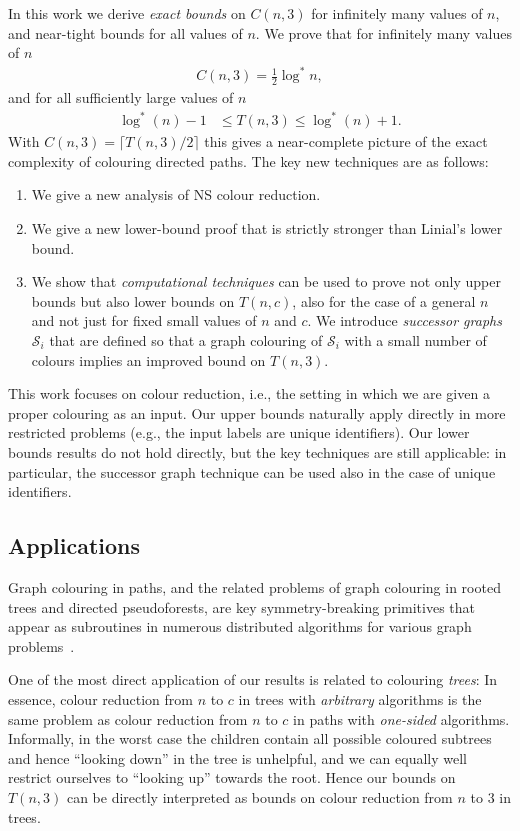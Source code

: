 \documentclass[a4paper,11pt]{article}
\theoremstyle{remark}
\newcommand{\cS}{\mathcal{S}}
\newcommand{\logst}{\log^{*}}
\begin{document}
In this work we derive \emph{exact bounds} on $C(n,3)$ for infinitely many values of $n$, and near-tight bounds for all values of $n$. We prove that for infinitely many values of $n$
\begin{align*}
    C(n,3) = \frac{1}{2} \logst n,
\end{align*}
and for all sufficiently large values of $n$
\begin{align*}
    \logst(n) - 1 &\le T(n,3) \le \logst(n) + 1.
\end{align*}
With $C(n,3) = \lceil T(n,3)/2 \rceil$ this gives a near-complete picture of the exact complexity of colouring directed paths. The key new techniques are as follows:
\begin{enumerate}
    \item We give a new analysis of NS colour reduction.
    \item We give a new lower-bound proof that is strictly stronger than Linial's lower bound.
    \item We show that \emph{computational techniques} can be used to prove not only upper bounds but also lower bounds on $T(n,c)$, also for the case of a general $n$ and not just for fixed small values of $n$ and $c$. We introduce \emph{successor graphs} $\cS_i$ that are defined so that a graph colouring of $\cS_i$ with a small number of colours implies an improved bound on $T(n,3)$.
\end{enumerate}
This work focuses on colour reduction, i.e., the setting in which we are given a proper colouring as an input. Our upper bounds naturally apply directly in more restricted problems (e.g., the input labels are unique identifiers). Our lower bounds results do not hold directly, but the key techniques are still applicable: in particular, the successor graph technique can be used also in the case of unique identifiers.


\subsection{Applications}

Graph colouring in paths, and the related problems of graph colouring in rooted trees and directed pseudoforests, are key symmetry-breaking primitives that appear as subroutines in numerous distributed algorithms for various graph problems~\cite{goldberg88parallel,panconesi01some,garay98sublinear,astrand10vc-sc,czygrinow08fast,lenzen14steiner}.

One of the most direct application of our results is related to colouring \emph{trees}: In essence, colour reduction from $n$ to $c$ in trees with \emph{arbitrary} algorithms is the same problem as colour reduction from $n$ to $c$ in paths with \emph{one-sided} algorithms. Informally, in the worst case the children contain all possible coloured subtrees and hence ``looking down'' in the tree is unhelpful, and we can equally well restrict ourselves to ``looking up'' towards the root. Hence our bounds on $T(n,3)$ can be directly interpreted as bounds on colour reduction from $n$ to $3$ in trees.
\end{document}
